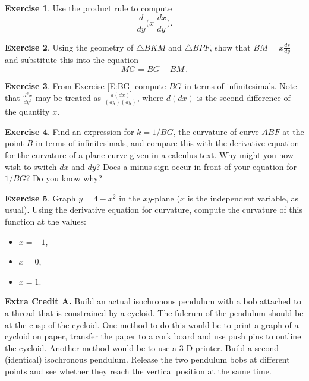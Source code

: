 \documentclass[12pt]{article}
\theoremstyle{definition}
\newtheorem{exercise}{Exercise}[section]
\begin{document}
\begin{exercise}  \label{E:product-rule}
Use the product rule to compute
$$  \frac{d \! }{d y} \Big(x \, \frac{\, d x}{d y}\Big ). $$
\end{exercise}

\begin{exercise}  \label{E:segment-BM}
Using the geometry of $\triangle BKM$ and $\triangle BPF$, show that
$BM = x \frac{ds}{dy}$ and substitute this into the equation 
$$  MG = BG - BM \, . $$
\end{exercise}

\begin{exercise}   \label{E:derivative-BG}
From Exercise \eqref{E:BG} compute $BG$ in terms of infinitesimals.  Note that
$\displaystyle \frac{d^2 x}{dy^2}$ may be treated as $\displaystyle
\frac{d(dx)}{(dy)(dy)}$, where $d(dx)$ is the second difference of the
quantity $x$.  
\end{exercise}

\begin{exercise}  \label{E:k=1/BG}
Find an expression for $k = 1/BG$, the curvature of curve
$ABF$ at the point $B$ in terms of infinitesimals, 
and compare this with the derivative
equation for the curvature of a plane curve given in a calculus text. 
Why might you now wish to switch $dx$ and $dy$?  Does a minus sign
occur in front of your equation for $1/BG$?  Do you know why?
\end{exercise}


\begin{exercise}  \label{E:derivative-parabola}
Graph $y = 4 - x^2$ in the $xy$-plane ($x$ is the independent
variable, as usual).  Using the derivative equation for curvature, 
compute the curvature of this function at the values:
\begin{itemize}
\item[(a)] $x = -1$,  
\item[(b)] $x = 0$,
\item[(c)] $x = 1$.
\end{itemize}
\end{exercise}

\medskip
\noindent
{\bf{Extra Credit A.}}  Build an actual isochronous pendulum with a
bob attached to a thread that is constrained by a cycloid.  The fulcrum
of the pendulum should be at the cusp of the cycloid.  One method to
do this would be to print a graph of a cycloid on paper, transfer the
paper to a cork board and use push pins to outline the cycloid.
Another method would be to use a 3-D printer.  Build
a second (identical) isochronous pendulum.  Release the two pendulum
bobs at different points and see whether they reach the vertical
position at the same time.
\end{document}
